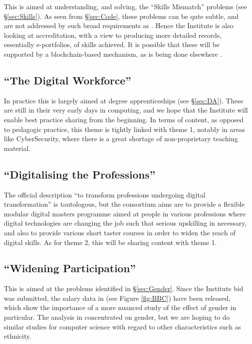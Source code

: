 \documentclass[sigconf,anonymous]{acmart}
\begin{document}
This is aimed at understanding, and solving, the ``Skills Mismatch''
problems (see \S\ref{sec:Skills}). As seen from \S\ref{sec:Code},
these problems can be qute subtle, and are not addressed by such broad
requirements as \cite[Requirement 2.3.1]{BCS2018a}.  Hence the Institute is also looking at accreditation, with a view to producing more detailed records, essentially e-portfolios, of skills achieved. It is possible that these will be supported by a blockchain-based mechanism, as is being done elsewhere \cite{RMIT2018a}.

\subsection{``The Digital Workforce''}

In practice this is largely aimed at degree apprenticeships (see
\S\ref{sec:DA}). These are still in their very early days in
computing, and we hope that the Institute will enable best practice
sharing from the beginning. In terms of content, as opposed to pedagogic practice, this theme is tightly linked with theme 1, notably in areas like CyberSecurity, where there is a great shortage of non-proprietary teaching material.

\subsection{``Digitalising the Professions''}

The official description ``to transform professions undergoing digital
transformation'' \cite{DfE2018a} is tautologous, but the consortium
aims are to provide a flexible modular digital masters programme aimed
at people in various professions where digital technologies are
changing the job such that serious upskilling in necessary, and also
to provide various short taster courses in order to widen the reach of
digital skills. As for theme 2, this will be sharing content with theme 1.

\subsection{``Widening Participation''}

This is aimed at the problems identified in \S\ref{sec:Gender}. Since
the Institute bid was submitted, the salary data in \cite{DfE2018d}
(see Figure \ref{fig:BBC}) have been released, which show the
importance of a more nuanced study of the effect of gender in
particular. The analysis in \cite{DfE2018d} concentrated on gender,
but we are hoping to do similar studies for computer science with
regard to other characteristics such as ethnicity.
\end{document}
